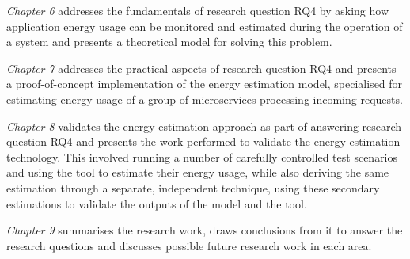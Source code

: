 \emph{Chapter 6} addresses the fundamentals of research question RQ4 by asking how application energy usage can be monitored and estimated during the operation of a system and presents a theoretical model for solving this problem.

\emph {Chapter 7} addresses the practical aspects of research question RQ4 and presents a proof-of-concept implementation of the energy estimation model, specialised for estimating energy usage of a group of microservices processing incoming requests.

\emph{Chapter 8} validates the energy estimation approach as part of answering research question RQ4 and presents the work performed to validate the energy estimation technology. This involved running a number of carefully controlled test scenarios and using the tool to estimate their energy usage, while also deriving the same estimation through a separate, independent technique, using these secondary estimations to validate the outputs of the model and the tool.

\emph {Chapter 9} summarises the research work, draws conclusions from it to answer the research questions and discusses possible future research work in each area.



